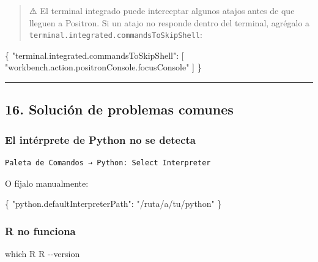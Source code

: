 \documentclass[
  doc,
  floatsintext,
  longtable,
  a4paper,
  nolmodern,
  notxfonts,
  notimes,
  12pt,
  colorlinks=true,linkcolor=blue,citecolor=blue,urlcolor=blue]{apa7}
\newenvironment{Shaded}{\begin{snugshade}}{\end{snugshade}}
\newcommand{\AttributeTok}[1]{\textcolor[rgb]{0.40,0.45,0.13}{#1}}
\newcommand{\DataTypeTok}[1]{\textcolor[rgb]{0.68,0.00,0.00}{#1}}
\newcommand{\ExtensionTok}[1]{\textcolor[rgb]{0.00,0.23,0.31}{#1}}
\newcommand{\FunctionTok}[1]{\textcolor[rgb]{0.28,0.35,0.67}{#1}}
\newcommand{\NormalTok}[1]{\textcolor[rgb]{0.00,0.23,0.31}{#1}}
\newcommand{\OtherTok}[1]{\textcolor[rgb]{0.00,0.23,0.31}{#1}}
\newcommand{\StringTok}[1]{\textcolor[rgb]{0.13,0.47,0.30}{#1}}
\begin{document}
\begin{quote}
⚠️ El terminal integrado puede interceptar algunos atajos antes de que
lleguen a Positron. Si un atajo no responde dentro del terminal,
agrégalo a \texttt{terminal.integrated.commandsToSkipShell}:
\end{quote}

\begin{Shaded}
\begin{Highlighting}[]
\FunctionTok{\{}
  \DataTypeTok{"terminal.integrated.commandsToSkipShell"}\FunctionTok{:} \OtherTok{[}
    \StringTok{"workbench.action.positronConsole.focusConsole"}
  \OtherTok{]}
\FunctionTok{\}}
\end{Highlighting}
\end{Shaded}

\begin{center}\rule{0.5\linewidth}{0.5pt}\end{center}

\subsection{16. Solución de problemas
comunes}\label{soluciuxf3n-de-problemas-comunes}

\subsubsection{El intérprete de Python no se
detecta}\label{el-intuxe9rprete-de-python-no-se-detecta}

\begin{verbatim}
Paleta de Comandos → Python: Select Interpreter
\end{verbatim}

O fíjalo manualmente:

\begin{Shaded}
\begin{Highlighting}[]
\FunctionTok{\{}
  \DataTypeTok{"python.defaultInterpreterPath"}\FunctionTok{:} \StringTok{"/ruta/a/tu/python"}
\FunctionTok{\}}
\end{Highlighting}
\end{Shaded}

\subsubsection{R no funciona}\label{r-no-funciona}

\begin{Shaded}
\begin{Highlighting}[]
\FunctionTok{which}\NormalTok{ R}
\ExtensionTok{R} \AttributeTok{{-}{-}version}
\end{Highlighting}
\end{Shaded}
\end{document}
